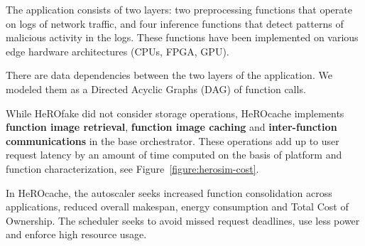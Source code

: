 
The application consists of two layers: two preprocessing functions that operate on logs of network traffic, and four inference functions that detect patterns of malicious activity in the logs. These functions have been implemented on various edge hardware architectures (CPUs, FPGA, GPU). 

There are data dependencies between the two layers of the application. We modeled them as a Directed Acyclic Graphs (DAG) of function calls. %



While HeROfake did not consider storage operations, HeROcache implements \textbf{function image retrieval}, \textbf{function image caching} and \textbf{inter-function communications} in the base orchestrator. These operations add up to user request latency by an amount of time computed on the basis of platform and function characterization, see Figure~\ref{figure:herosim-cost}. %


In HeROcache, the autoscaler seeks increased function consolidation across applications, reduced overall makespan, energy consumption and Total Cost of Ownership. The scheduler seeks to avoid missed request deadlines, use less power and enforce high resource usage.

